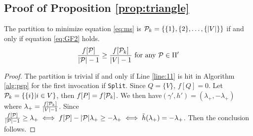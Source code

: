 \subsection{Proof of Proposition \ref{prop:triangle}}
\begin{lemma}\label{lem:trival}
	The partition to minimize equation \eqref{eq:ms} is $\P_k = \{\{1\},\{2\},\dots,\{\abs{V}\}\}$ if and only if equation \eqref{eq:GF2} holds.
	\begin{equation}\label{eq:GF2}
	\frac{f[\P]}{\abs{\P}-1} \geq \frac{f[\P_k]}{\abs{V}-1} \textrm{ for any } \P \in \Pi'
	\end{equation}
\end{lemma}
\begin{proof}
	The partition is trivial if and only if Line \ref{line:11} is hit in Algorithm \ref{alg:psp} for the first invocation if \texttt{Split}.
	Since $Q=\{V\}$, $f[Q]=0$. Let $\P_k = \{\{i\} | i \in V\}$, then $ f[P] = f[\P_k]$. We then have$(\gamma', h')=(\lambda_{+}, -\lambda_{+})$ where $\lambda_{+} = \frac{f[\P_k]}{\abs{V}-1}$. Since $\frac{f[\P]}{\abs{\P}-1} \geq \lambda_{+} \iff f[\P] - \abs{\P}\lambda_{+} \geq - \lambda_{+} \iff \tilde{h}(\lambda_{+}) = - \lambda_{+}$. Then the conclusion follows.
\end{proof}

